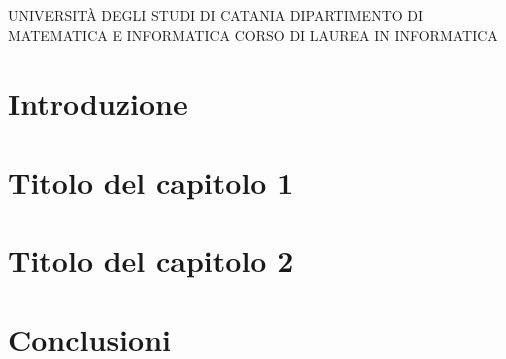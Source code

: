 






\thispagestyle{empty}

\universita
{UNIVERSITÀ DEGLI STUDI DI CATANIA}
{DIPARTIMENTO DI MATEMATICA E INFORMATICA}
{CORSO DI LAUREA IN INFORMATICA}






\fskip\fskip




\fskip






\tableofcontents


\listoftables


\listoffigures

\cleardoublepage



\chapter{Introduzione}


\chapter{Titolo del capitolo 1}


\chapter{Titolo del capitolo 2}


\chapter{Conclusioni}

















